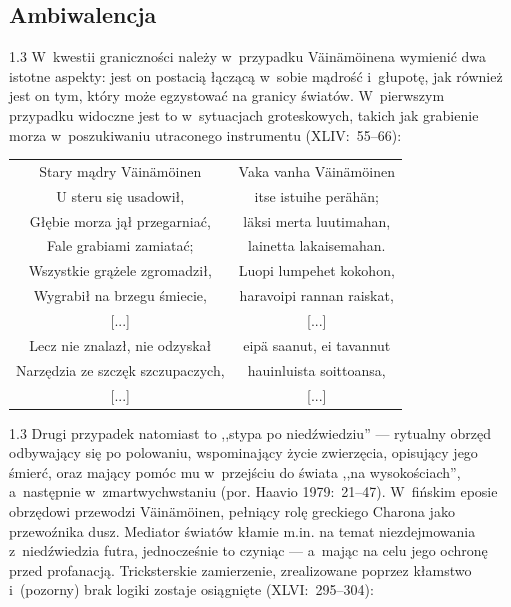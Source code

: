 \documentclass[11pt,a4paper,twoside]{report}
\begin{document}
\subsection*{Ambiwalencja}
\begin{spacing}{1.3}
W~kwestii graniczności należy w~przypadku Väinämöinena wymienić dwa istotne aspekty: jest on postacią łączącą w~sobie mądrość i~głupotę, jak również jest on tym, który może egzystować na granicy światów. W~pierwszym przypadku widoczne jest to w~sytuacjach groteskowych, takich jak grabienie morza w~poszukiwaniu utraconego instrumentu (XLIV:~55--66):
\end{spacing}
{\centering
\small
\begin{longtable}{c c}
Stary mądry Väinämöinen & Vaka vanha Väinämöinen \\
U steru się usadowił, & itse istuihe perähän; \\
Głębie morza jął przegarniać, & läksi merta luutimahan, \\
Fale grabiami zamiatać; & lainetta lakaisemahan. \\
Wszystkie grążele zgromadził, & Luopi lumpehet kokohon, \\
Wygrabił na brzegu śmiecie, & haravoipi rannan raiskat, \\
{[...]} & {[...]} \\
Lecz nie znalazł, nie odzyskał & eipä saanut, ei tavannut \\
Narzędzia ze szczęk szczupaczych, & hauinluista soittoansa, \\
{[...]} & {[...]} \\
\end{longtable}
}
\begin{spacing}{1.3}
Drugi przypadek natomiast to ,,stypa po niedźwiedziu'' --- rytualny obrzęd odbywający się po polowaniu, wspominający życie zwierzęcia, opisujący jego śmierć, oraz mający pomóc mu w~przejściu do świata ,,na wysokościach'', a~następnie w~zmartwychwstaniu (por. Haavio 1979:~21--47). W~fińskim eposie obrzędowi przewodzi Väinämöinen, pełniący rolę greckiego Charona jako przewoźnika dusz. Mediator światów kłamie m.in. na temat niezdejmowania z~niedźwiedzia futra, jednocześnie to czyniąc --- a~mając na celu jego ochronę przed profanacją. Tricksterskie zamierzenie, zrealizowane poprzez kłamstwo i~(pozorny) brak logiki zostaje osiągnięte (XLVI:~295--304):
\end{spacing}
\end{document}
